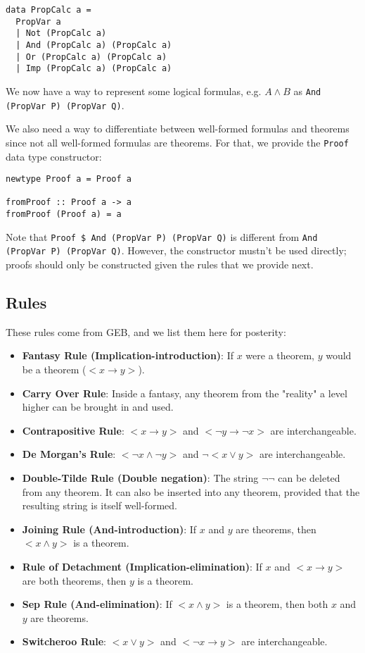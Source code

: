 \documentclass{article}
\begin{document}
\begin{lstlisting}
data PropCalc a =
  PropVar a
  | Not (PropCalc a)
  | And (PropCalc a) (PropCalc a)
  | Or (PropCalc a) (PropCalc a)
  | Imp (PropCalc a) (PropCalc a)
\end{lstlisting}

We now have a way to represent some logical formulas, e.g. $A \land B$ as \texttt{And (PropVar P) (PropVar Q)}.

We also need a way to differentiate between well-formed formulas and theorems since not all well-formed formulas are theorems. For that, we provide the \texttt{Proof} data type constructor:

\begin{lstlisting}
newtype Proof a = Proof a

fromProof :: Proof a -> a
fromProof (Proof a) = a
\end{lstlisting}

Note that \texttt{Proof \$ And (PropVar P) (PropVar Q)} is different from \texttt{And (PropVar P) (PropVar Q)}. However, the constructor mustn't be used directly; proofs should only be constructed given the rules that we provide next.

\subsection{Rules}

These rules come from GEB, and we list them here for posterity:

\begin{itemize}
\item \textbf{Fantasy Rule (Implication-introduction)}: If $x$ were a theorem, $y$ would be a theorem ($<x \to y>$).
\item \textbf{Carry Over Rule}: Inside a fantasy, any theorem from the "reality" a level higher can be brought in and used.
\item \textbf{Contrapositive Rule}: $< x \to y>$ and $< \neg y \to \neg x>$ are interchangeable.
\item \textbf{De Morgan's Rule}: $< \neg x \land \neg y>$ and $\neg<x \lor y>$ are interchangeable.
\item \textbf{Double-Tilde Rule (Double negation)}: The string $\neg\neg$ can be deleted from any theorem. It can also be inserted into any theorem, provided that the resulting string is itself well-formed.
\item \textbf{Joining Rule (And-introduction)}: If $x$ and $y$ are theorems, then $<x \land y>$ is a theorem.
\item \textbf{Rule of Detachment (Implication-elimination)}: If $x$ and $<x \to y>$ are both theorems, then $y$ is a theorem.
\item \textbf{Sep Rule (And-elimination)}: If $<x \land y>$ is a theorem, then both $x$ and $y$ are theorems.
\item \textbf{Switcheroo Rule}: $<x \lor y>$ and $<\neg x \to y>$ are interchangeable.
\end{itemize}
\end{document}
